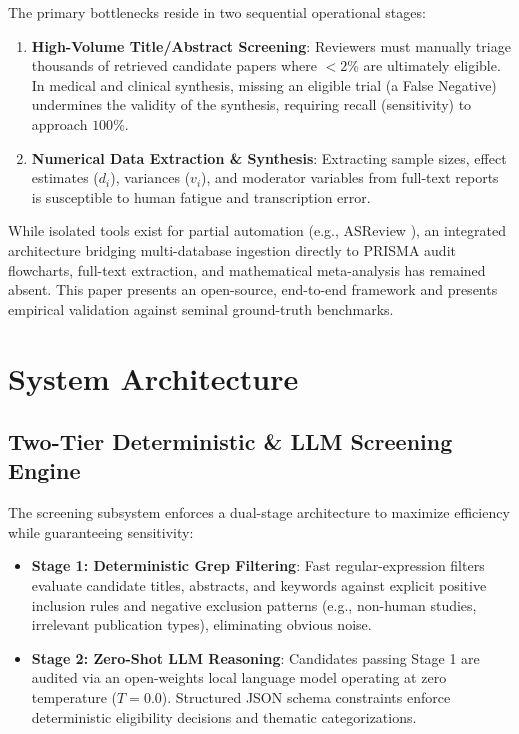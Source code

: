 \documentclass[journal]{IEEEtran}
\begin{document}
The primary bottlenecks reside in two sequential operational stages:
\begin{enumerate}
    \item \textbf{High-Volume Title/Abstract Screening}: Reviewers must manually triage thousands of retrieved candidate papers where $<2\%$ are ultimately eligible. In medical and clinical synthesis, missing an eligible trial (a False Negative) undermines the validity of the synthesis, requiring recall (sensitivity) to approach $100\%$.
    \item \textbf{Numerical Data Extraction \& Synthesis}: Extracting sample sizes, effect estimates ($d_i$), variances ($v_i$), and moderator variables from full-text reports is susceptible to human fatigue and transcription error.
\end{enumerate}

While isolated tools exist for partial automation (e.g., ASReview \cite{van2021active}), an integrated architecture bridging multi-database ingestion directly to PRISMA audit flowcharts, full-text extraction, and mathematical meta-analysis has remained absent. This paper presents an open-source, end-to-end framework and presents empirical validation against seminal ground-truth benchmarks.

\section{System Architecture}

\subsection{Two-Tier Deterministic \& LLM Screening Engine}
The screening subsystem enforces a dual-stage architecture to maximize efficiency while guaranteeing sensitivity:
\begin{itemize}
    \item \textbf{Stage 1: Deterministic Grep Filtering}: Fast regular-expression filters evaluate candidate titles, abstracts, and keywords against explicit positive inclusion rules and negative exclusion patterns (e.g., non-human studies, irrelevant publication types), eliminating obvious noise.
    \item \textbf{Stage 2: Zero-Shot LLM Reasoning}: Candidates passing Stage 1 are audited via an open-weights local language model operating at zero temperature ($T=0.0$). Structured JSON schema constraints enforce deterministic eligibility decisions and thematic categorizations.
\end{itemize}
\end{document}
